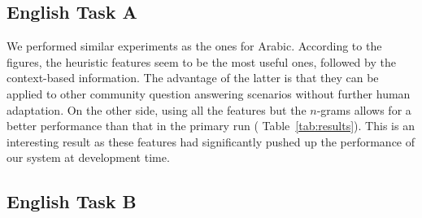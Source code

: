 
\subsection{English Task A} \label{sec:discussiona}

We performed similar experiments as the ones for Arabic.
According to the 
figures, the heuristic features seem to be the most useful ones, followed by the 
context-based information. The advantage of the latter is that they can be 
applied to other community question answering scenarios without further human 
adaptation. On the other side, using all the features but the $n$-grams allows 
for a better performance than that in the primary run (\cf 
Table~\ref{tab:results}). 
This is an interesting result as these features had significantly pushed up the 
performance of our system at development time. 
 
  
\subsection{English Task B} \label{sec:discussionb}


